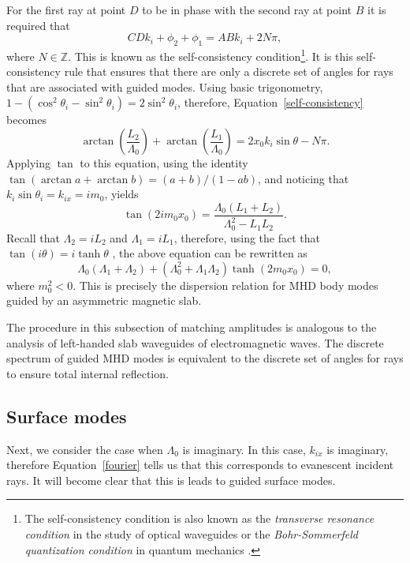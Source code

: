 	For the first ray at point $D$ to be in phase with the second ray at point $B$ it is required that
	\begin{equation}
	CD k_i  + \phi_2 + \phi_1 = AB k_i + 2N\pi, \label{self-consistency}
	\end{equation}
	where $N \in \mathbb{Z}$.
	This is known as the self-consistency condition\footnote{The self-consistency condition is also known as the \textit{transverse resonance condition} in the study of optical waveguides \citep{sym_etal92} or the \textit{Bohr-Sommerfeld quantization condition} in quantum mechanics \citep{mes61}.}. It is this self-consistency rule that ensures that there are only a discrete set of angles for rays that are associated with guided modes. Using basic trigonometry, $1 - (\cos^2{\theta_i} - \sin^2{\theta_i}) = 2\sin^2{\theta_i}$, therefore, Equation~\eqref{self-consistency} becomes
	\begin{equation}
	\arctan\left(\frac{L_2}{\Lambda_0}\right) + \arctan\left(\frac{L_1}{\Lambda_0}\right) = 2x_0k_i \sin{\theta} - N\pi.
	\end{equation}
	Applying $\tan$ to this equation, using the identity $\tan(\arctan{a} + \arctan{b}) = (a + b) / (1 - ab)$, and noticing that $k_i\sin{\theta_i} = k_{ix} = im_0$, yields
	\begin{equation}
	\tan(2im_0x_0) = \frac{\Lambda_0 (L_1 + L_2)}{\Lambda_0^2 - L_1L_2}.
	\end{equation}
	Recall that $\Lambda_2 = iL_2$ and $\Lambda_1 = iL_1$, therefore, using the fact that $\tan(i\theta) = i\tanh{\theta}$ \citep{abr_etal65}, the above equation can be rewritten as
	\begin{equation}
	\Lambda_0 (\Lambda_1 + \Lambda_2) + (\Lambda_0^2 + \Lambda_1\Lambda_2)\tanh(2m_0x_0) = 0, \label{DR}
	\end{equation}
	where $m_0^2 < 0$. This is precisely the dispersion relation for MHD body modes guided by an asymmetric magnetic slab.
	
	The procedure in this subsection of matching amplitudes is analogous to the analysis of left-handed slab waveguides of electromagnetic waves. The discrete spectrum of guided MHD modes is equivalent to the discrete set of angles for rays to ensure total internal reflection.
	
	
	\subsection{Surface modes}
	Next, we consider the case when $\Lambda_0$ is imaginary. In this case, $k_{ix}$ is imaginary, therefore Equation~\eqref{fourier} tells us that this corresponds to evanescent incident rays. It will become clear that this is leads to guided surface modes.
	
